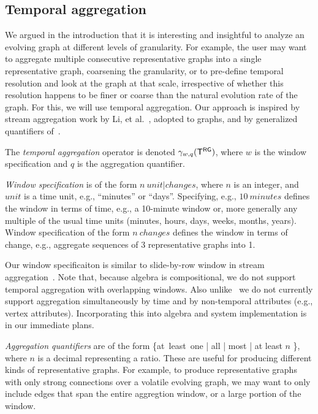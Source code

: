 \subsection{Temporal aggregation}
\label{sec:algebra:agg}

We argued in the introduction that it is interesting and insightful to
analyze an evolving graph at different levels of granularity.  For
example, the user may want to aggregate multiple consecutive
representative graphs into a single representative graph, coarsening
the granularity, or to pre-define temporal resolution and look at the
graph at that scale, irrespective of whether this resolution happens
to be finer or coarse than the natural evolution rate of the graph.
For this, we will use temporal aggregation.  Our approach is inspired
by stream aggregation work by Li, et al.~\cite{Li2005}, adopted to
graphs, and by generalized quantifiers of~\cite{Hsu1995}.

The {\em temporal aggregation} operator is denoted $\gamma_{w,q}
(\mathsf{T^{RG}})$, where $w$ is the window specification and $q$ is the
aggregation quantifier.

{\em Window specification} is of the form $n~{unit|changes}$, where
$n$ is an integer, and $unit$ is a time unit, e.g., ``minutes'' or
``days''.  Specifying, e.g., $10~minutes$ defines the window in terms
of time, e.g., a 10-minute window or, more generally any multiple of
the usual time units (minutes, hours, days, weeks, months, years).
Window specification of the form $n~changes$ defines the window in
terms of change, e.g., aggregate sequences of 3 representative graphs
into 1.

Our window specificaiton is similar to slide-by-row window in stream
aggregation~\cite{Li2005}.  Note that, because \tg algebra is
compositional, we do not support temporal aggregation with overlapping
windows. Also unlike~\cite{Li2005} we do not currently support
aggregation simultaneously by time and by non-temporal attributes
(e.g., vertex attributes). Incorporating this into \tg algebra and
system implementation is in our immediate plans.

{\em Aggregation quantifiers} are of the form \{at\ least\ one | all |
most | at least $n$ \}, where $n$ is a decimal representing a ratio.
      These are useful for producing different kinds of representative
      graphs.  For example, to produce representative graphs with only
      strong connections over a volatile evolving graph, we may want
      to only include edges that span the entire aggregtion window, or
      a large portion of the window.  


